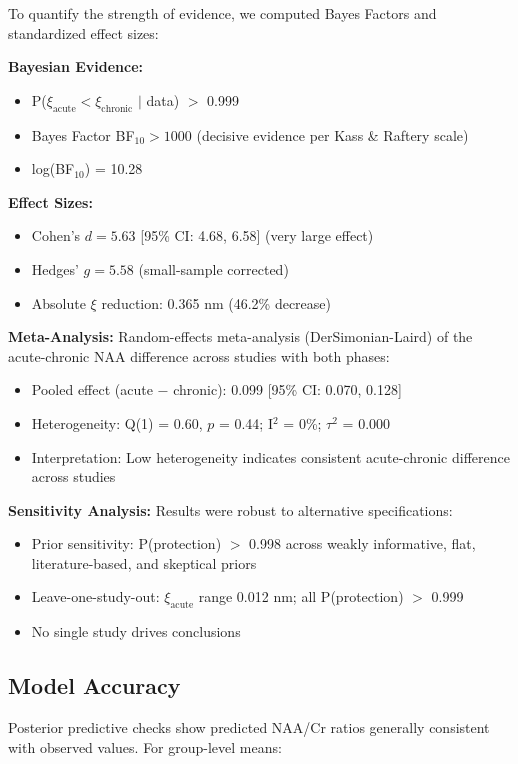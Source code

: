 \documentclass[10pt,a4paper]{article}
\begin{document}
To quantify the strength of evidence, we computed Bayes Factors and standardized effect sizes:

\textbf{Bayesian Evidence:}
\begin{itemize}
\item P($\xi_{\text{acute}} < \xi_{\text{chronic}}$ $|$ data) $>$ 0.999
\item Bayes Factor BF$_{10} > 1000$ (decisive evidence per Kass \& Raftery scale)
\item log(BF$_{10}$) = 10.28
\end{itemize}

\textbf{Effect Sizes:}
\begin{itemize}
\item Cohen's $d = 5.63$ [95\% CI: 4.68, 6.58] (very large effect)
\item Hedges' $g = 5.58$ (small-sample corrected)
\item Absolute $\xi$ reduction: 0.365 nm (46.2\% decrease)
\end{itemize}

\textbf{Meta-Analysis:}
Random-effects meta-analysis (DerSimonian-Laird) of the acute-chronic NAA difference across studies with both phases:
\begin{itemize}
\item Pooled effect (acute $-$ chronic): 0.099 [95\% CI: 0.070, 0.128]
\item Heterogeneity: Q(1) = 0.60, $p$ = 0.44; I$^2$ = 0\%; $\tau^2$ = 0.000
\item Interpretation: Low heterogeneity indicates consistent acute-chronic difference across studies
\end{itemize}

\textbf{Sensitivity Analysis:}
Results were robust to alternative specifications:
\begin{itemize}
\item Prior sensitivity: P(protection) $>$ 0.998 across weakly informative, flat, literature-based, and skeptical priors
\item Leave-one-study-out: $\xi_{\text{acute}}$ range 0.012 nm; all P(protection) $>$ 0.999
\item No single study drives conclusions
\end{itemize}

\subsection{Model Accuracy}

Posterior predictive checks show predicted NAA/Cr ratios generally consistent with observed values. For group-level means:
\end{document}
